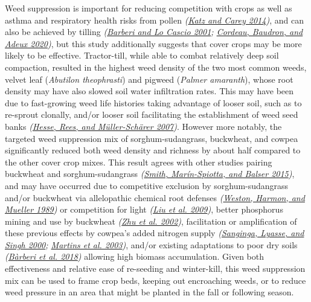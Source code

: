 \documentclass[
  12pt,
]{article}
\begin{document}
Weed suppression is important for reducing competition with crops as well as asthma and respiratory health risks from pollen \emph{(\protect\hyperlink{ref-katz14}{Katz and Carey 2014})}, and can also be achieved by tilling \emph{(\protect\hyperlink{ref-barberi01}{Barberi and Lo Cascio 2001}; \protect\hyperlink{ref-cordeau20}{Cordeau, Baudron, and Adeux 2020})}, but this study additionally suggests that cover crops may be more likely to be effective.
Tractor-till, while able to combat relatively deep soil compaction, resulted in the highest weed density of the two most common weeds, velvet leaf (\emph{Abutilon theophrasti}) and pigweed (\emph{Palmer amaranth}), whose root density may have also slowed soil water infiltration rates.
This may have been due to fast-growing weed life histories taking advantage of looser soil, such as to re-sprout clonally, and/or looser soil facilitating the establishment of weed seed banks \emph{(\protect\hyperlink{ref-hesse07}{Hesse, Rees, and Müller-Schärer 2007})}.
However more notably, the targeted weed suppression mix of sorghum-sudangrass, buckwheat, and cowpea significantly reduced both weed density and richness by about half compared to the other cover crop mixes.
This result agrees with other studies pairing buckwheat and sorghum-sudangrass \emph{(\protect\hyperlink{ref-smith15}{Smith, Marín-Spiotta, and Balser 2015})}, and may have occurred due to competitive exclusion by sorghum-sudangrass and/or buckwheat via allelopathic chemical root defenses \emph{(\protect\hyperlink{ref-weston89}{Weston, Harmon, and Mueller 1989})} or competition for light \emph{(\protect\hyperlink{ref-liu09b}{Liu et al. 2009})}, better phosphorus mining and use by buckwheat \emph{(\protect\hyperlink{ref-zhu02}{Zhu et al. 2002})}, facilitation or amplification of these previous effects by cowpea's added nitrogen supply \emph{(\protect\hyperlink{ref-sanginga00}{Sanginga, Lyasse, and Singh 2000}; \protect\hyperlink{ref-martins03}{Martins et al. 2003})}, and/or existing adaptations to poor dry soils \emph{(\protect\hyperlink{ref-barberi18}{Bàrberi et al. 2018})} allowing high biomass accumulation.
Given both effectiveness and relative ease of re-seeding and winter-kill, this weed suppression mix can be used to frame crop beds, keeping out encroaching weeds, or to reduce weed pressure in an area that might be planted in the fall or following season.
\end{document}
